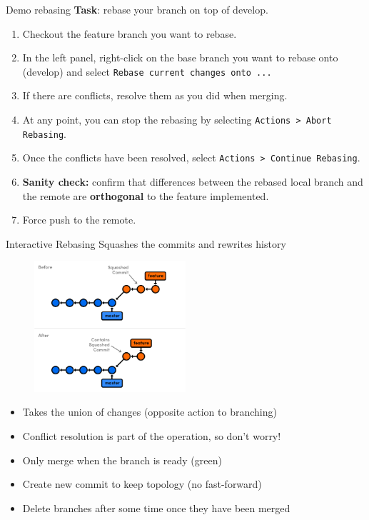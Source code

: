 \documentclass[compress,english,aspectratio=1610]{beamer}
\let\olditem\item
\renewcommand{\item}{\setlength{\itemsep}{\fill}\olditem}
\begin{document}
\begin{frame}{Demo rebasing}
	\textbf{Task}: rebase your branch on top of develop.
		\begin{enumerate}
			\item Checkout the feature branch you want to rebase.
			\item In the left panel, right-click on the base branch you want to rebase onto (develop) and select {\tt Rebase current changes onto ...}
			\item If there are conflicts, resolve them as you did when merging.
			\item At any point, you can stop the rebasing by selecting {\tt Actions > Abort Rebasing}.
			\item Once the conflicts have been resolved, select {\tt Actions > Continue Rebasing}.
			\item \textbf{Sanity check:} confirm that differences between the rebased local branch and the remote are \textbf{orthogonal} to the feature implemented.
			\item Force push to the remote.
    		\end{enumerate}
\end{frame}

\begin{frame}{Interactive Rebasing}
	Squashes the commits and rewrites history
	\begin{figure}
     	\includegraphics[width=0.5\textwidth]{figures/interactive-rebase.png}
    \end{figure}
	\begin{itemize}
		\item Takes the union of changes (opposite action to branching)
		\item Conflict resolution is part of the operation, so don't worry!
		\item Only merge when the branch is ready (green)
		\item Create new commit to keep topology (no fast-forward)
		\item Delete branches after some time once they have been merged
	\end{itemize}
\end{frame}
\end{document}
